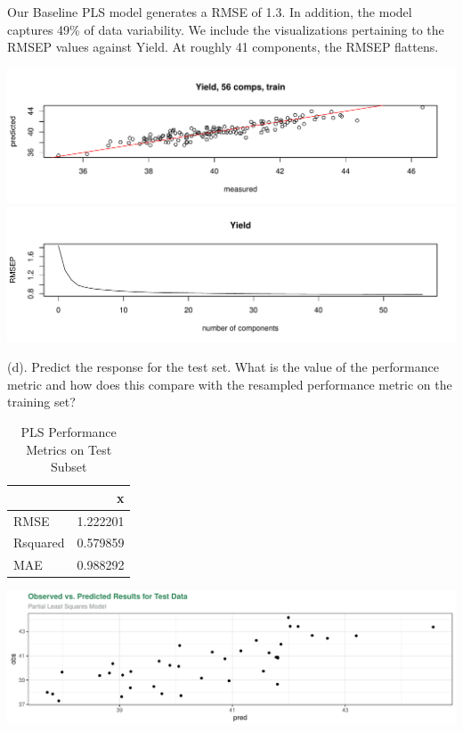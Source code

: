 \documentclass[]{report}
\begin{document}
Our Baseline PLS model generates a RMSE of 1.3. In addition, the model
captures 49\% of data variability. We include the visualizations
pertaining to the RMSEP values against Yield. At roughly 41 components,
the RMSEP flattens.

\includegraphics{Homework-Two_files/figure-latex/kj-6.3c2-1.pdf}
\includegraphics{Homework-Two_files/figure-latex/kj-6.3c2-2.pdf}

\begin{subquestion}{(d).} Predict the response for the test set. What is the value of the performance metric and how does this compare with the resampled performance metric on the training set? 
\end{subquestion}

\begin{table}[H]

\caption{\label{tab:kj-6.3d}PLS Performance Metrics on Test Subset}
\centering
\begin{tabular}[t]{l|r}
\hline
  & x\\
\hline
\rowcolor{gray!6}  RMSE & 1.222201\\
\hline
Rsquared & 0.579859\\
\hline
\rowcolor{gray!6}  MAE & 0.988292\\
\hline
\end{tabular}
\end{table}

\includegraphics{Homework-Two_files/figure-latex/kj-6.3d-1.pdf}
\end{document}

